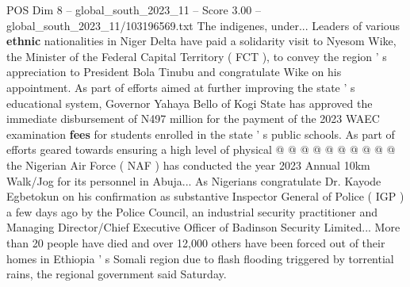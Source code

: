 \begin{textsample}{POS Dim 8 – global\_south\_2023\_11 – Score 3.00 – global\_south\_2023\_11/103196569.txt}
The indigenes, under...
Leaders of various \textbf{ethnic} nationalities in Niger Delta have paid a solidarity visit to Nyesom Wike, the Minister of the Federal Capital Territory ( FCT ), to convey the region ' s appreciation to President Bola Tinubu and congratulate Wike on his appointment.
As part of efforts aimed at further improving the state ' s educational system, Governor Yahaya Bello of Kogi State has approved the immediate disbursement of N497 million for the payment of the 2023 WAEC examination \textbf{fees} for students enrolled in the state ' s public schools.
As part of efforts geared towards ensuring a high level of physical @ @ @ @ @ @ @ @ @ @ the Nigerian Air Force ( NAF ) has conducted the year 2023 Annual 10km Walk/Jog for its personnel in Abuja...
As Nigerians congratulate Dr.
Kayode Egbetokun on his confirmation as substantive Inspector General of Police ( IGP ) a few days ago by the Police Council, an industrial security practitioner and Managing Director/Chief Executive Officer of Badinson Security Limited...
More than 20 people have died and over 12,000 others have been forced out of their homes in Ethiopia ' s Somali region due to flash flooding triggered by torrential rains, the regional government said Saturday.

\end{textsample}
